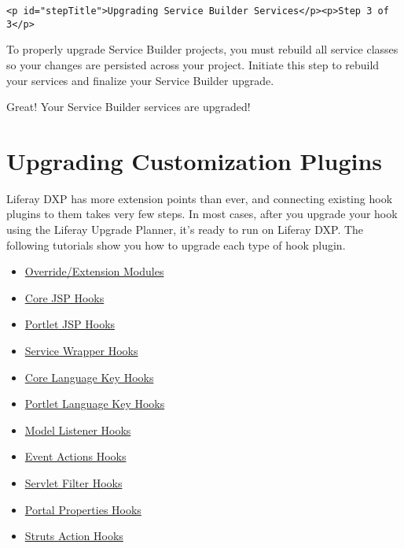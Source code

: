 \begin{verbatim}
<p id="stepTitle">Upgrading Service Builder Services</p><p>Step 3 of 3</p>
\end{verbatim}

To properly upgrade Service Builder projects, you must rebuild all
service classes so your changes are persisted across your project.
Initiate this step to rebuild your services and finalize your Service
Builder upgrade.

Great! Your Service Builder services are upgraded!

\chapter{Upgrading Customization
Plugins}\label{upgrading-customization-plugins}

Liferay DXP has more extension points than ever, and connecting existing
hook plugins to them takes very few steps. In most cases, after you
upgrade your hook using the Liferay Upgrade Planner, it's ready to run
on Liferay DXP. The following tutorials show you how to upgrade each
type of hook plugin.

\begin{itemize}
\tightlist
\item
  \href{/docs/7-2/tutorials/-/knowledge_base/t/upgrading-customization-modules}{Override/Extension
  Modules}
\item
  \href{/docs/7-2/tutorials/-/knowledge_base/t/upgrading-core-jsp-hooks}{Core
  JSP Hooks}
\item
  \href{/docs/7-2/tutorials/-/knowledge_base/t/upgrading-portlet-jsp-hooks}{Portlet
  JSP Hooks}
\item
  \href{/docs/7-2/tutorials/-/knowledge_base/t/upgrading-service-wrapper-hooks}{Service
  Wrapper Hooks}
\item
  \href{/docs/7-2/tutorials/-/knowledge_base/t/upgrading-core-language-key-hooks}{Core
  Language Key Hooks}
\item
  \href{/docs/7-2/tutorials/-/knowledge_base/t/upgrading-portlet-language-key-hooks}{Portlet
  Language Key Hooks}
\item
  \href{/docs/7-2/tutorials/-/knowledge_base/t/upgrading-model-listener-hooks}{Model
  Listener Hooks}
\item
  \href{/docs/7-2/tutorials/-/knowledge_base/t/upgrading-event-action-hooks}{Event
  Actions Hooks}
\item
  \href{/docs/7-2/tutorials/-/knowledge_base/t/upgrading-servlet-filter-hooks}{Servlet
  Filter Hooks}
\item
  \href{/docs/7-2/tutorials/-/knowledge_base/t/upgrading-portal-property-hooks}{Portal
  Properties Hooks}
\item
  \href{/docs/7-2/tutorials/-/knowledge_base/t/upgrading-struts-action-hooks}{Struts
  Action Hooks}
\end{itemize}

